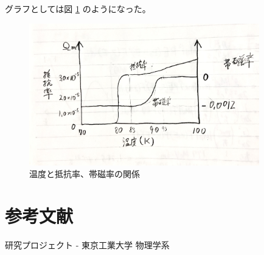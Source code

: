 \documentclass[uplatex,dvipdfmx,a4paper,11pt]{jlreq}
\numberwithin{equation}{section}
\theoremstyle{definition}
\begin{document}
グラフとしては図 \ref{fig:graph} のようになった。
\begin{figure}[htbp]
  \centering
  \includegraphics[width=10cm]{./assets/YBCO_graph.jpg}
  \caption{温度と抵抗率、帯磁率の関係}
  \label{fig:graph}
\end{figure}



\section{参考文献}
研究プロジェクト - 東京工業大学 物理学系
\end{document}
